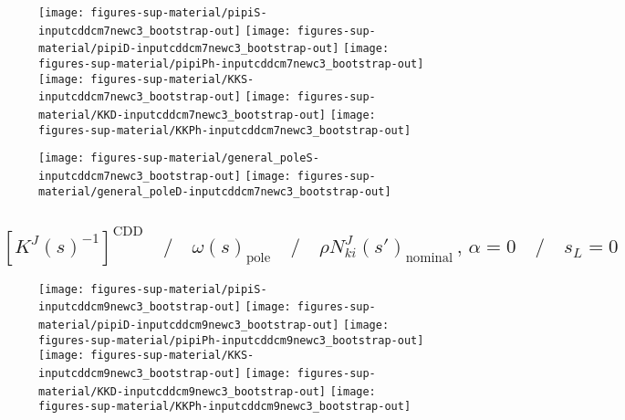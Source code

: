 



\begin{figure}[h]
\centering\texttt{[image: figures-sup-material/pipiS-inputcddcm7newc3\_bootstrap-out]} \texttt{[image: figures-sup-material/pipiD-inputcddcm7newc3\_bootstrap-out]} \texttt{[image: figures-sup-material/pipiPh-inputcddcm7newc3\_bootstrap-out]}
\texttt{[image: figures-sup-material/KKS-inputcddcm7newc3\_bootstrap-out]} \texttt{[image: figures-sup-material/KKD-inputcddcm7newc3\_bootstrap-out]} \texttt{[image: figures-sup-material/KKPh-inputcddcm7newc3\_bootstrap-out]}
\end{figure}

\begin{figure}[h]
\centering\texttt{[image: figures-sup-material/general\_poleS-inputcddcm7newc3\_bootstrap-out]} \texttt{[image: figures-sup-material/general\_poleD-inputcddcm7newc3\_bootstrap-out]}
\end{figure}



\clearpage

\subsection{$\left[K^J(s)^{-1}\right]^\text{CDD} \quad\Big/\quad \omega(s)_\text{pole} \quad\Big/\quad \rho N^J_{ki}(s')_\text{nominal}\,,\,\alpha = 0  \quad\Big/\quad s_L = 0$}
\label{subsec:inputcddcm9newc3_bootstrap-out}






\begin{figure}[h]
\centering\texttt{[image: figures-sup-material/pipiS-inputcddcm9newc3\_bootstrap-out]} \texttt{[image: figures-sup-material/pipiD-inputcddcm9newc3\_bootstrap-out]} \texttt{[image: figures-sup-material/pipiPh-inputcddcm9newc3\_bootstrap-out]}
\texttt{[image: figures-sup-material/KKS-inputcddcm9newc3\_bootstrap-out]} \texttt{[image: figures-sup-material/KKD-inputcddcm9newc3\_bootstrap-out]} \texttt{[image: figures-sup-material/KKPh-inputcddcm9newc3\_bootstrap-out]}
\end{figure}

